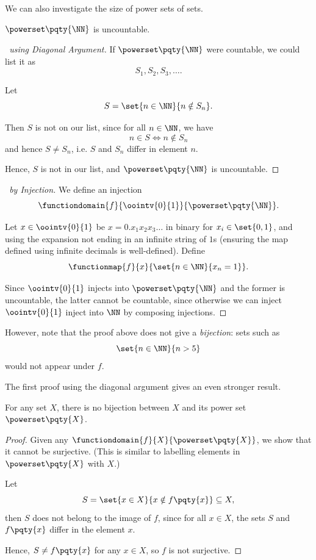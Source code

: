 We can also investigate the size of power sets of sets.

\begin{theorem}
    \(\powerset\pqty{\NN}\) is uncountable.
\end{theorem}

\begin{proof}[\proofname\ using Diagonal Argument]
    If \(\powerset\pqty{\NN}\) were countable, we could list it as
    \[
        S_1, S_2, S_3, \ldots.
    \]

    Let
    \[
        S = \set{n \in \NN}{n \notin S_n}.
    \]

    Then \(S\) is not on our list, since for all \(n \in \NN\), we have
    \[
        n \in S \iff n \notin S_n
    \]
    and hence \(S \neq S_n\), i.e. \(S\) and \(S_n\) differ in element \(n\).

    Hence, \(S\) is not in our list, and \(\powerset\pqty{\NN}\) is uncountable.
\end{proof}

\begin{proof}[\proofname\ by Injection]
    We define an injection
    \[
        \functiondomain{f}{\oointv{0}{1}}{\powerset\pqty{\NN}}.
    \]

    Let \(x \in \oointv{0}{1}\) be \(x = 0.x_1 x_2 x_3 \ldots\) in binary for \(x_i \in \set{0, 1}\), and using the expansion not ending in an infinite string of \(1\)s (ensuring the map defined using infinite decimals is well-defined). Define
    \[
        \functionmap{f}{x}{\set{n \in \NN}{x_n = 1}}.
    \]

    Since \(\oointv{0}{1}\) injects into \(\powerset\pqty{\NN}\) and the former is uncountable, the latter cannot be countable, since otherwise we can inject \(\oointv{0}{1}\) inject into \(\NN\) by composing injections.
\end{proof}

However, note that the proof above does not give a \emph{bijection}: sets such as
\[
    \set{n \in \NN}{n > 5}
\]
would not appear under \(f\).

The first proof using the diagonal argument gives an even stronger result.

\begin{theorem}
    For any set \(X\), there is no bijection between \(X\) and its power set \(\powerset\pqty{X}\).
\end{theorem}

\begin{proof}
    Given any \(\functiondomain{f}{X}{\powerset\pqty{X}}\), we show that it cannot be surjective. (This is similar to labelling elements in \(\powerset\pqty{X}\) with \(X\).)

    Let
    \[
        S = \set{x \in X}{x \notin f\pqty{x}} \subseteq X,
    \]
    then \(S\) does not belong to the image of \(f\), since for all \(x \in X\), the sets \(S\) and \(f\pqty{x}\) differ in the element \(x\).

    Hence, \(S \neq f\pqty{x}\) for any \(x \in X\), so \(f\) is not surjective.
\end{proof}

